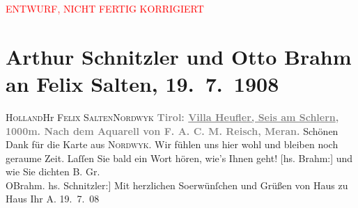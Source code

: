 
\begin{center}
            \textcolor{red}{ENTWURF, NICHT FERTIG KORRIGIERT}
                      \end{center}
            
         
         \newcommand{\erwaehntePersonen}{Personen: Franz August Carl Maria Reisch, Felix Salten}
         \newcommand{\erwaehnteOrte}{Orte: Meran, Niederlande, Noordwijk, Seis am Schlern, Südtirol, Villa Heufler}
         \newcommand{\erwaehnteWerke}{Werke: Partie in Seis am Schlern}
               \section[Arthur Schnitzler und Otto Brahm an Felix Salten, 19. 7. 1908]{ Arthur Schnitzler und Otto Brahm an Felix Salten,
               19. 7. 1908}\nopagebreak{}\rehead{ }\begin{ledgroupsized}[t]{13cm}\normalsize\beginnumbering \toendnotes[C]{\smallbreak\pagebreak[2]} 
\toendnotes[C]{\smallbreak}\pstart{}{\pb}\textsc{Holland}\pend{}\pstart{}Hr \textsc{Felix Salten}\pend{}\pstart{}\textsc{Nordwyk}\pend{}{\bigskip}\pstart
           \noindent{}\centering{}{\pb}\textcolor{gray}{\textbf{Tirol: \uline{Villa Heufler, Seis am Schlern}, 1000m. Nach dem Aquarell von F. A. C. M.
                     Reisch, Meran. }}\pend
           \pstart
           {\pb}Schönen Dank für die Karte aus \textsc{Nordwyk}. Wir fühlen uns hier wohl und bleiben noch geraume Zeit. Laſſen Sie bald ein
               Wort hören, wie’s Ihnen geht! {[}hs. Brahm:{]} und wie Sie dichten\pend
           \pstart
           B. Gr.{\\}\spacefill\mbox{OBrahm.}\pend
           \pstart {[}hs. Schnitzler:{]} Mit herzlichen So{\geminationm}erwünſchen und Grüßen von Haus zu Haus Ihr \spacefill\mbox{A.}\pend{}\pstart
           \raggedleft{}19. 7. 08\pend
           

\end{ledgroupsized}

